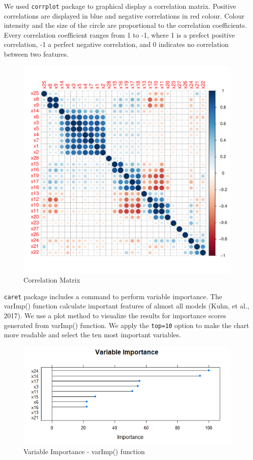 \documentclass{article}
\begin{document}
We used \texttt{corrplot} package to graphical display a correlation matrix. Positive correlations are displayed in blue and negative correlations in red colour. Colour intensity and the size of the circle are proportional to the correlation coefficients. Every correlation coefficient ranges from 1 to -1, where 1 is a prefect positive
correlation, -1 a perfect negative correlation, and 0 indicates no correlation between two features.

\begin{figure}
\caption{Correlation Matrix }
\includegraphics[scale=1]{../CART/CorrPlot.pdf}
\end{figure}

\texttt{caret} package includes a command to perform variable importance. The varImp() function calculate important features of almost all models (Kuhn, et al., 2017). We use a plot method to visualize the results for importance scores generated from varImp() function. We apply the \texttt{top=10} option to make the chart more readable and select the ten most important variables.

\begin{figure}
\caption{Variable Importance - varImp() function}
\includegraphics[scale=1]{../CART/VarImp_top_10.png}
\end{figure}
\end{document}
